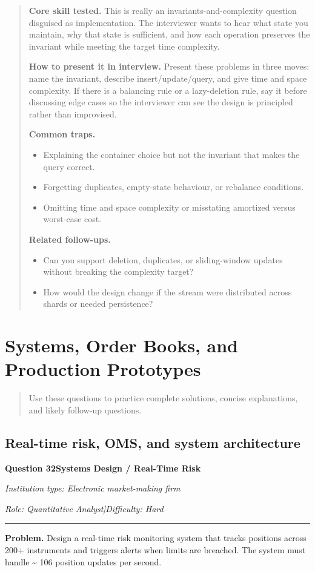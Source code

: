 \documentclass[11pt,letterpaper,openany]{book}
\newcommand{\ChapterIntro}[1]{%
  \begin{quote}\small #1\end{quote}%
}
\newenvironment{EditorialNote}
  {\begin{quote}\small\setlength{\parskip}{0.25em}}
  {\end{quote}}
\newcommand{\QuestionSpacer}{\vspace{0.4em}}
\newcommand{\InterviewQuestionHeader}[5]{%
  \vspace{1.0em}%
  {\large\bfseries #1\enspace #4\par}%
  {\small\itshape Institution type: #2\par}%
  {\small\itshape Role: #3\enspace |\enspace Difficulty: #5\par}%
  \vspace{0.25em}\hrule\vspace{0.45em}%
}
\begin{document}
\begin{EditorialNote}


\textbf{Core skill tested.} This is really an invariants-and-complexity question disguised as implementation. The interviewer wants to hear what state you maintain, why that state is sufficient, and how each operation preserves the invariant while meeting the target time complexity.

\textbf{How to present it in interview.} Present these problems in three moves: name the invariant, describe insert/update/query, and give time and space complexity. If there is a balancing rule or a lazy-deletion rule, say it before discussing edge cases so the interviewer can see the design is principled rather than improvised.

\textbf{Common traps.}
\begin{itemize}
\item Explaining the container choice but not the invariant that makes the query correct.
\item Forgetting duplicates, empty-state behaviour, or rebalance conditions.
\item Omitting time and space complexity or misstating amortized versus worst-case cost.
\end{itemize}

\textbf{Related follow-ups.}
\begin{itemize}
\item Can you support deletion, duplicates, or sliding-window updates without breaking the complexity target?
\item How would the design change if the stream were distributed across shards or needed persistence?
\end{itemize}


\end{EditorialNote}
\QuestionSpacer

\section{Systems, Order Books, and Production Prototypes}
\ChapterIntro{Use these questions to practice complete solutions, concise explanations, and likely follow-up questions.}

\subsection{Real-time risk, OMS, and system architecture}

\InterviewQuestionHeader{Question 32}{Electronic market-making firm}{Quantitative Analyst}{Systems Design / Real-Time Risk}{Hard}
\textbf{Problem.} Design a real-time risk monitoring system that tracks positions across 200+ instruments and triggers alerts when limits are breached. The system must handle \textasciitilde{} 106 position updates per second.
\end{document}
